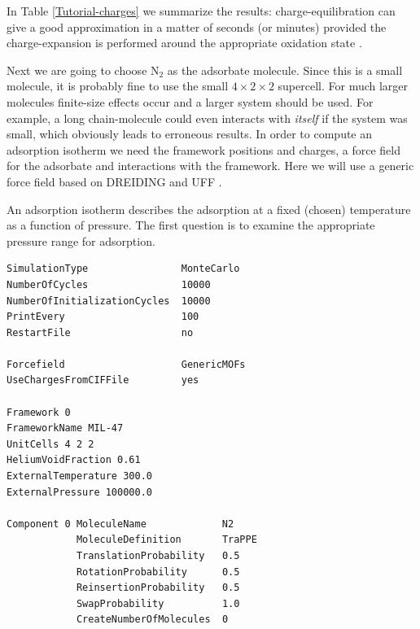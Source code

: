 In Table \ref{Tutorial-charges} we summarize the results: charge-equilibration can give a good approximation in a matter of seconds (or minutes)
provided the charge-expansion is performed around the appropriate oxidation state \cite{Wilmer2012}.


Next we are going to choose N$_2$ as the adsorbate molecule. Since this is a small molecule, it is probably fine to use the small $4\times2\times2$ supercell.
For much larger molecules finite-size effects occur and a larger system should be used. For example, a long chain-molecule could even interacts with 
\emph{itself} if the system was small, which obviously leads to erroneous results.
In order to compute an adsorption isotherm we need the framework positions and charges, a force field for the adsorbate and interactions with the framework.
Here we will use a generic force field based on DREIDING and UFF \cite{MayoOlafsonGoddard1990,RappeCasewitColwellGoddardSkiff1992}.

An adsorption isotherm describes the adsorption at a fixed (chosen) temperature as a function of pressure. The first question is to examine the appropriate
pressure range for adsorption.

\begin{center}
\end{center}

\begin{center}
\end{center}

\begin{verbatim}
SimulationType                MonteCarlo
NumberOfCycles                10000
NumberOfInitializationCycles  10000
PrintEvery                    100
RestartFile                   no

Forcefield                    GenericMOFs
UseChargesFromCIFFile         yes

Framework 0
FrameworkName MIL-47
UnitCells 4 2 2
HeliumVoidFraction 0.61
ExternalTemperature 300.0
ExternalPressure 100000.0

Component 0 MoleculeName             N2
            MoleculeDefinition       TraPPE
            TranslationProbability   0.5
            RotationProbability      0.5
            ReinsertionProbability   0.5
            SwapProbability          1.0
            CreateNumberOfMolecules  0
\end{verbatim}

